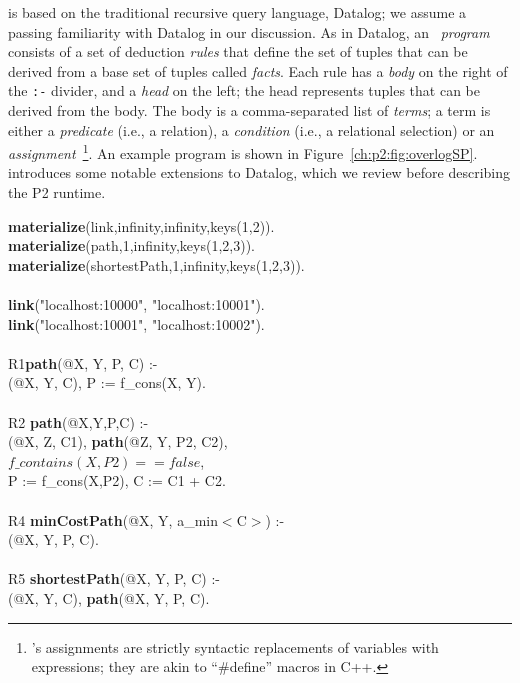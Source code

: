 \OVERLOG is based on the traditional recursive query language, Datalog; we
assume a passing familiarity with Datalog in our discussion.  As in Datalog, an
\OVERLOG~{\em program} consists of a set of deduction {\em rules} that define
the set of tuples that can be derived from a base set of tuples called {\em
facts}.  Each rule has a {\em body} on the right of the \texttt{:-} divider,
and a {\em head} on the left; the head represents tuples that can be derived
from the body.  The body is a comma-separated list of {\em terms}; a term is
either a {\em predicate} (i.e., a relation), a {\em condition} (i.e., a
relational selection) or an {\em assignment}~\footnote{\OVERLOG's assignments
are strictly syntactic replacements of variables with expressions; they are
akin to ``\#define'' macros in C++.}.  An example \OVERLOG program is shown in
Figure~\ref{ch:p2:fig:overlogSP}.  \OVERLOG introduces some notable extensions
to Datalog, which we review before describing the P2 runtime.

\begin{figure*}
\ssp
\begin{boxedminipage}{\linewidth}
{\bf materialize}(link,infinity,infinity,keys(1,2)). \\
{\bf materialize}(path,1,infinity,keys(1,2,3)).  \\
{\bf materialize}(shortestPath,1,infinity,keys(1,2,3)). \\
\\
{\bf link}("localhost:10000", "localhost:10001"). \\
{\bf link}("localhost:10001", "localhost:10002"). \\
\\
R1{\bf path}(@X, Y, P, C) :- \\
(@X, Y, C), P := f\_cons(X, Y). \\
\\       
R2 {\bf path}(@X,Y,P,C) :- \\
(@X, Z, C1), {\bf path}(@Z, Y, P2, C2), \\
\datalogspace $f\_contains(X,P2) == false$, \\
\datalogspace P := f\_cons(X,P2), C := C1 + C2. \\ 
\\      
R4 {\bf minCostPath}(@X, Y, a\_min$<$C$>$) :-  \\
(@X, Y, P, C). \\
\\
R5 {\bf shortestPath}(@X, Y, P, C) :- \\
(@X, Y, C), {\bf path}(@X, Y, P, C).\\
\end{boxedminipage}
\caption{\label{ch:p2:fig:overlogSP}Shortest path program in \OVERLOG. 
prefixes introduce aggregate functions and  prefixes introduce
built-in functions.}
\end{figure*}

